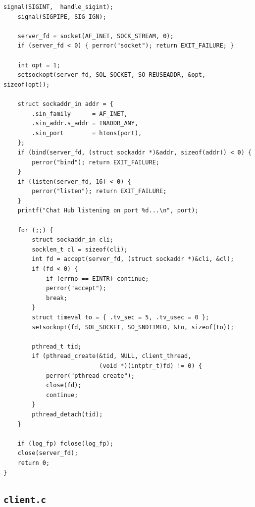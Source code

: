 \documentclass[12pt,a4paper]{article}
\begin{document}
\begin{lstlisting}[caption={\texttt{server.c}, hub de chat multi-clients}]
    signal(SIGINT,  handle_sigint);
    signal(SIGPIPE, SIG_IGN);

    server_fd = socket(AF_INET, SOCK_STREAM, 0);
    if (server_fd < 0) { perror("socket"); return EXIT_FAILURE; }

    int opt = 1;
    setsockopt(server_fd, SOL_SOCKET, SO_REUSEADDR, &opt, sizeof(opt));

    struct sockaddr_in addr = {
        .sin_family      = AF_INET,
        .sin_addr.s_addr = INADDR_ANY,
        .sin_port        = htons(port),
    };
    if (bind(server_fd, (struct sockaddr *)&addr, sizeof(addr)) < 0) {
        perror("bind"); return EXIT_FAILURE;
    }
    if (listen(server_fd, 16) < 0) {
        perror("listen"); return EXIT_FAILURE;
    }
    printf("Chat Hub listening on port %d...\n", port);

    for (;;) {
        struct sockaddr_in cli;
        socklen_t cl = sizeof(cli);
        int fd = accept(server_fd, (struct sockaddr *)&cli, &cl);
        if (fd < 0) {
            if (errno == EINTR) continue;
            perror("accept");
            break;
        }
        struct timeval to = { .tv_sec = 5, .tv_usec = 0 };
        setsockopt(fd, SOL_SOCKET, SO_SNDTIMEO, &to, sizeof(to));

        pthread_t tid;
        if (pthread_create(&tid, NULL, client_thread,
                           (void *)(intptr_t)fd) != 0) {
            perror("pthread_create");
            close(fd);
            continue;
        }
        pthread_detach(tid);
    }

    if (log_fp) fclose(log_fp);
    close(server_fd);
    return 0;
}
\end{lstlisting}

\subsection{\texttt{client.c}}
\end{document}
